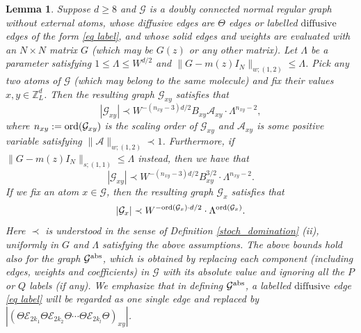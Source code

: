 \documentclass{article}
\newcommand{\1}{\mathds{1}}
\numberwithin{equation}{section}
\newcommand{\ord}{{\rm{ord}}}
\newcommand{\be}{\begin{equation}}
\newcommand{\ee}{\end{equation}}
\newcommand{\e}{{\varepsilon}}
\renewcommand{\cal}{\mathcal}
\newcommand{\wh}{\widehat}
\newcommand{\wt}{\widetilde}
\renewcommand{\leq}{\leqslant}
\renewcommand{\geq}{\geqslant}
\renewcommand{\le}{\leq}
\renewcommand{\ge}{\geq}
\newcommand{\Z}{\mathbb{Z}}
\newcommand{\dashed}{\text{diffusive}}
\theoremstyle{plain} %
\newtheorem{lemma}[theorem]{Lemma}
\theoremstyle{remark}
\newcommand{\nc}{\normalcolor}
\newcommand{\copu}{\color{purple}}
\newcommand{\Sele}{{\mathcal E}}
\begin{document}
\begin{lemma}\label{no dot}
 Suppose $d\ge 8$ and $\cal G$ is a doubly connected normal regular graph without external atoms, whose diffusive edges are $\Theta$ edges or labelled $\dashed$ edges of the form \eqref{eq label}, and whose solid edges and weights are evaluated with an $N\times N$ matrix $G$ (which may be $G(z)$ or any other matrix). %
Let $\Lambda$ be a parameter satisfying $1\le \Lambda\le W^{d/2}$ and $\|G-m(z)I_N\|_{w;(1,2)}\le \Lambda$. %
Pick any two atoms of $\cal G$ (which may belong to the same molecule) and fix their values $x , y\in \Z_L^d$. Then the resulting graph $\cal G_{xy}$ satisfies  that %
\be\label{bound 2net1}
\left|\cal G_{xy}\right| \prec W^{ - \left(n_{xy}-3\right)d/2 } B_{xy} \cal A_{xy}\cdot \Lambda^{n_{xy}-2},
\ee
where  $n_{xy}:=\ord(\cal G_{xy})$ is the scaling order of $\cal G_{xy}$ and  $\cal A_{xy}$ is some  positive variable  satisfying $\|\cal A\|_{w;(1,2)}\prec 1$.
Furthermore, %
if $\|G-m(z)I_N\|_{s;(1,1)}\le \Lambda$ instead, then we have that
\be\label{bound 2net1 strong}
\left|\cal G_{xy}\right| \prec W^{ -  \left(n_{xy}-3\right)d/2} B_{xy}^{3/2}\cdot \Lambda^{n_{xy}-2}.
\ee
If we fix an atom $x \in \cal G$, then  the resulting graph  $\cal G_{x}$ satisfies  that
\be\label{bound 2net1 singlex}
\left|\cal G_{x}\right| \prec W^{ - \ord(\cal G_{x}) \cdot d/2 }\cdot \Lambda^{\ord(\cal G_{x})} .
\ee
Here $\prec$ is understood in the sense of Definition \ref{stoch_domination} (ii), uniformly in $G$ and $\Lambda$ satisfying the above assumptions. The above bounds  hold also  for the graph $ {\cal G}^{{\rm abs}}$, which is obtained by replacing each component (including edges, weights and coefficients) in $\cal G$ with its absolute value and ignoring all the $P$ or $Q$ labels (if any). We emphasize that in defining $ {\cal G}^{{\rm abs}}$, a labelled $\dashed$ edge \eqref{eq label} will be regarded as one single edge and replaced by $|\left(\Theta \Sele_{2k_1}\Theta  \Sele_{2k_2}\Theta \cdots \Theta  \Sele_{2k_l}\Theta\right)_{xy}|$.

\end{lemma}
\end{document}
